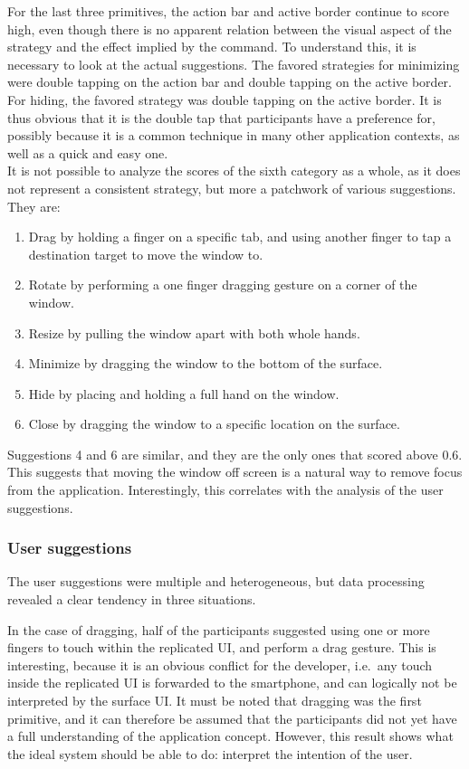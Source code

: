 For the last three primitives, the action bar and active border continue to score high, even though there is no apparent relation between the visual aspect of the strategy and the effect implied by the command.
To understand this, it is necessary to look at the actual suggestions.
The favored strategies for minimizing were double tapping on the action bar and double tapping on the active border.
For hiding, the favored strategy was double tapping on the active border.
It is thus obvious that it is the double tap that participants have a preference for, possibly because it is a common technique in many other application contexts, as well as a quick and easy one.
\\
\linebreak
It is not possible to analyze the scores of the sixth category as a whole, as it does not represent a consistent strategy, but more a patchwork of various suggestions. They are:
\begin{enumerate}
\item Drag by holding a finger on a specific tab, and using another finger to tap a destination target to move the window to.
\item Rotate by performing a one finger dragging gesture on a corner of the window.
\item Resize by pulling the window apart with both whole hands.
\item Minimize by dragging the window to the bottom of the surface.
\item Hide by placing and holding a full hand on the window.
\item Close by dragging the window to a specific location on the surface.
\end{enumerate}
Suggestions 4 and 6 are similar, and they are the only ones that scored above 0.6.
This suggests that moving the window off screen is a natural way to remove focus from the application.
Interestingly, this correlates with the analysis of the user suggestions.

\subsubsection{User suggestions}

The user suggestions were multiple and heterogeneous, but data processing revealed a clear tendency in three situations.

In the case of dragging, half of the participants suggested using one or more fingers to touch within the replicated UI, and perform a drag gesture.
This is interesting, because it is an obvious conflict for the developer, i.e.\ any touch inside the replicated UI is forwarded to the smartphone, and can logically not be interpreted by the surface UI.
It must be noted that dragging was the first primitive, and it can therefore be assumed that the participants did not yet have a full understanding of the application concept.
However, this result shows what the ideal system should be able to do: interpret the intention of the user.

